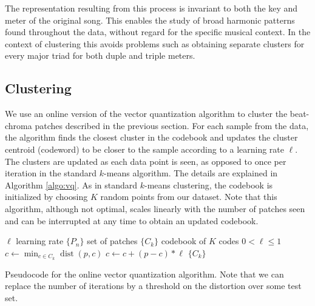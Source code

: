 \documentclass{article}
\DeclareMathOperator*{\dist}{dist}
\begin{document}
The representation resulting from this process is invariant to both
the key and meter of the original song.  This enables the study of
broad harmonic patterns found throughout the data, without regard for
the specific musical context.
%
In the context of clustering this avoids problems such as obtaining separate
clusters for every major triad for both duple and triple meters.
%

\subsection{Clustering}


We use an online version of the vector quantization algorithm
\cite{Gersho1991} to cluster the beat-chroma patches described in the
previous section.
For each sample from the data, the algorithm finds the closest cluster
in the codebook and updates the cluster centroid (codeword) to be
closer to the sample according to a learning rate $\ell$.
The clusters are updated as each data point is seen, as opposed to
once per iteration in the standard $k$-means algorithm.
The details are explained in Algorithm \ref{algo:vq}.
%
As in standard $k$-means clustering, the codebook is initialized by
choosing $K$ random points from our dataset.
%
Note that this algorithm, although not optimal, scales linearly with
the number of patches seen and can be interrupted at any time
to obtain an updated codebook. %

\begin{algorithm}
\begin{algorithmic}
\STATE$\ell$ learning rate
\STATE$\{P_n\}$ set of patches
\STATE$\{C_k\}$ codebook of $K$ codes
\REQUIRE $0 < \ell \leq 1$
\STATE$c \leftarrow \min_{c \in C_k} \dist(p,c)$
\STATE$c \leftarrow c + (p - c) * \ell$
\ENDFOR
\ENDFOR
\RETURN $\{C_k\}$
\caption{\small{Pseudocode for the online vector quantization
    algorithm. Note that we can replace the number of iterations by a
    threshold on the distortion over some test set.}
\label{algo:vq}}
\end{algorithmic}
\end{algorithm}
\end{document}
